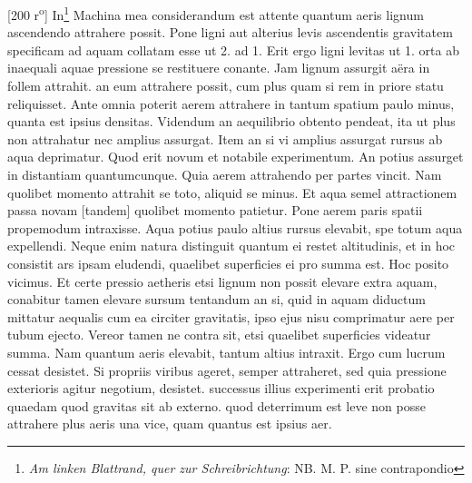                 \vspace*{8mm}
                \pstart 
                \normalsize
            [200 r\textsuperscript{o}] In\footnote{\textit{Am linken Blattrand, quer zur Schreibrichtung}: NB. M. P. sine contrapondio} Machina mea considerandum est attente quantum aeris lignum ascendendo attrahere possit. Pone ligni aut alterius levis ascendentis gravitatem specificam ad aquam collatam esse ut 2. ad 1.  Erit ergo ligni levitas ut 1. orta ab inaequali aquae pressione\protect{} se restituere conante. Jam lignum  assurgit a\"{e}ra in follem attrahit.  an eum attrahere possit, cum plus  quam si rem in priore statu reliquisset. Ante omnia poterit  aerem attrahere in tantum spatium paulo minus, quanta est ipsius  densitas\protect{}. Videndum an aequilibrio\protect{} obtento pendeat, ita ut plus non attrahatur nec amplius assurgat. Item an si vi amplius assurgat rursus ab aqua deprimatur. Quod erit novum et notabile experimentum. An potius assurget in distantiam quantumcunque. Quia aerem attrahendo per partes vincit. Nam quolibet momento attrahit se toto, aliquid se minus. Et aqua semel attractionem passa novam [tandem]  quolibet momento patietur. Pone  aerem paris spatii propemodum intraxisse. Aqua potius paulo altius rursus elevabit, spe totum aqua expellendi. Neque enim natura distinguit quantum ei restet altitudinis, et in hoc consistit ars ipsam eludendi, quaelibet superficies ei pro summa est. Hoc posito vicimus. Et certe pressio aetheris\protect{} etsi lignum non possit elevare extra aquam, conabitur tamen elevare sursum tentandum an si,  quid in aquam diductum mittatur aequalis cum ea circiter gravitatis\protect{}, ipso ejus nisu  comprimatur aere per tubum ejecto. Vereor tamen ne contra sit, etsi quaelibet superficies videatur summa. Nam quantum aeris  elevabit, tantum altius intraxit. Ergo cum lucrum cessat desistet. Si propriis viribus ageret, semper attraheret, sed quia pressione  exterioris agitur negotium, desistet.  successus illius experimenti erit probatio  quaedam quod gravitas\protect{} sit ab externo. \pend \pstart {} quod deterrimum est leve non posse attrahere plus aeris una vice, quam quantus est ipsius aer. 